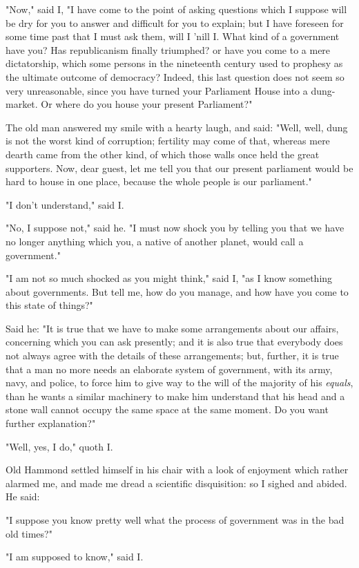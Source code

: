 "Now," said I, "I have come to the point of asking questions which I
suppose will be dry for you to answer and difficult for you to explain;
but I have foreseen for some time past that I must ask them, will I
'nill I. What kind of a government have you? Has republicanism finally
triumphed? or have you come to a mere dictatorship, which some persons
in the nineteenth century used to prophesy as the ultimate outcome of
democracy? Indeed, this last question does not seem so very
unreasonable, since you have turned your Parliament House into a
dung-market. Or where do you house your present Parliament?"

The old man answered my smile with a hearty laugh, and said: "Well,
well, dung is not the worst kind of corruption; fertility may come of
that, whereas mere dearth came from the other kind, of which those walls
once held the great supporters. Now, dear guest, let me tell you that
our present parliament would be hard to house in one place, because the
whole people is our parliament."

"I don't understand," said I.

"No, I suppose not," said he. "I must now shock you by telling you that
we have no longer anything which you, a native of another planet, would
call a government."

"I am not so much shocked as you might think," said I, "as I know
something about governments. But tell me, how do you manage, and how
have you come to this state of things?"

Said he: "It is true that we have to make some arrangements about our
affairs, concerning which you can ask presently; and it is also true
that everybody does not always agree with the details of these
arrangements; but, further, it is true that a man no more needs an
elaborate system of government, with its army, navy, and police, to
force him to give way to the will of the majority of his \emph{equals},
than he wants a similar machinery to make him understand that his head
and a stone wall cannot occupy the same space at the same moment. Do you
want further explanation?"

"Well, yes, I do," quoth I.

Old Hammond settled himself in his chair with a look of enjoyment which
rather alarmed me, and made me dread a scientific disquisition: so I
sighed and abided. He said:

"I suppose you know pretty well what the process of government was in
the bad old times?"

"I am supposed to know," said I.


